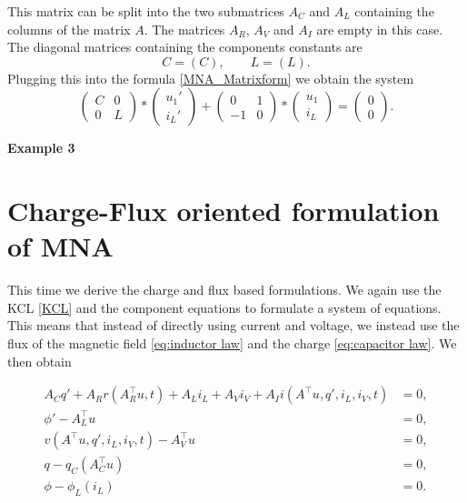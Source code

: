  This matrix can be split into the two submatrices $A_C$ and $A_L$ containing the columns of the matrix $A$. The matrices $A_R$, $A_V$ and $A_I$ are empty in this case. The diagonal matrices containing the components constants are
\begin{displaymath}
	C = (C), \qquad L = (L).
\end{displaymath}
Plugging this into the formula \eqref{MNA_Matrixform} we obtain the system
\begin{displaymath}
	\begin{pmatrix}
		C & 0 \\
		0 & L 
	\end{pmatrix}
	*
	\begin{pmatrix}
		u_1' \\
		i_L'
	\end{pmatrix}
	+
	\begin{pmatrix}
		0 & 1 \\
		-1 & 0
	\end{pmatrix}
	*
	\begin{pmatrix}
		u_1 \\
		i_L
	\end{pmatrix}
	=
	\begin{pmatrix}
		0 \\
		0 
	\end{pmatrix}.
\end{displaymath}


\textbf{Example 3} \label{ex:Example 3} \\



\section{Charge-Flux oriented formulation of MNA}
\label{sec:charge flux oriented formulation}
 This time we derive the charge and flux based formulations. We again use the KCL \eqref{KCL} and the component equations to formulate a system of equations. This means that instead of directly using current and voltage, we instead use the flux of the magnetic field \eqref{eq:inductor law} and the charge \eqref{eq:capacitor law}. We then obtain

\begin{align}
	A_C q' + A_R r(A_R^\top u,t) + A_L i_L + A_V i_V + A_I i(A^\top u, q', i_L, i_V, t) &= 0, \label{charge/flux-1} \\
	\phi' - A_L^\top u &= 0, \label{charge/flux-2} \\
	v(A^\top u, q', i_L, i_V, t) - A_V^\top u &= 0, \label{charge/flux-3} \\
	q - q_C(A_C^\top u) &= 0, \label{charge/flux-4} \\
	\phi - \phi_L(i_L) &= 0.  \label{charge/flux-5} 
\end{align}

